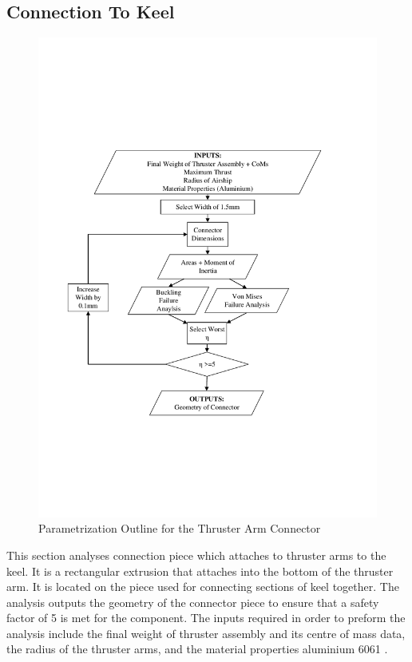 \documentclass[../main.tex]{subfiles}
\begin{document}
\subsection{Connection To Keel} \label{connector}
\begin{figure}[H]
	\centering
	\includegraphics[width=.9\linewidth]{img/paramaterization/connector.pdf}
	\caption{Parametrization Outline for the Thruster Arm Connector}
	\label{fig:connectorParametrization}
\end{figure}

This section analyses connection piece which attaches to thruster arms to the keel. It is a rectangular extrusion that attaches into the bottom of the thruster arm. It is located on the piece used for connecting sections of keel together. The analysis outputs the geometry of the connector piece to ensure that a safety factor of 5 is met for the component. The inputs required in order to preform the analysis include the final weight of thruster assembly and its centre of mass data, the radius of the thruster arms, and the material properties aluminium 6061 \cite{AlProperties}. 
\end{document}
